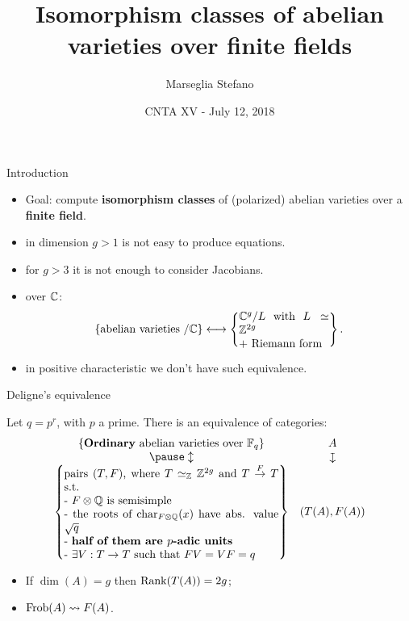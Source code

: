 \documentclass{beamer}
\title[]{Isomorphism classes of abelian varieties over finite fields}
\subtitle{}
\author[Marseglia Stefano]{Marseglia Stefano}
\institute[]{Stockholm University}
\date{CNTA XV - July 12, 2018}
\begin{document}
\begin{frame}
\titlepage
\end{frame}

\begin{frame}{ Introduction }
\begin{itemize}
 \item Goal: compute \textbf{isomorphism classes} of (polarized) abelian varieties over a \textbf{finite field}.
 \pause \item in dimension $g>1$ is not easy to produce equations.
 \pause \item for $g>3$ it is not enough to consider Jacobians.
 \pause \item over $\mathbb{C}$:
 \[
      \set{ \text{abelian varieties $/\C$} } \longleftrightarrow 
      \set{\parbox[c]{8em}{$\C^g/L$ with $L\simeq \Z^{2g}$\\ $+$ Riemann form}}.
 \]
 \pause \vspace{-6mm} \item in positive characteristic we don't have such equivalence.
\end{itemize}
\end{frame}

\begin{frame}{ Deligne's equivalence }
\begin{theorem}[Deligne '69]
Let $q=p^r$, with $p$ a prime. There is an equivalence of categories:
\[\begin{array}{cc}
\set{\text{\textbf{Ordinary} abelian varieties over $\F_q$}}	& A \\
\pause \updownarrow							& \downmapsto \\
\set{\parbox[p]{19em}{pairs $(T,F)$, where $T\simeq_\Z \Z^{2g}$ and $T\overset{F}{\to} T$ s.t.\\
- $F\otimes \Q$ is semisimple\\
- the roots of $\Char_{F\otimes\Q}(x)$ have abs. value $\sqrt{q}$\\
- \textbf{half of them are $p$-adic units}\\
- $\exists V:T\to T$ such that $FV=VF=q$
}}	& (T(A),F(A))
\end{array}\]
\end{theorem}
\pause
\begin{remark}
\begin{itemize}
 \item If $\dim(A)=g$ then $\operatorname{Rank}(T(A))=2g$;
 \item $\operatorname{Frob}(A)\rightsquigarrow F(A)$.
\end{itemize}
\end{remark}
\end{frame}
\end{document}
